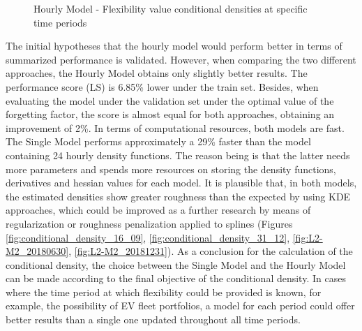 

\begin{figure}[htbp]
\centering    
{}
\caption{Hourly Model - Flexibility value conditional densities at specific time periods}
\label{fig:conditional_densities_L2}
\end{figure}


The initial hypotheses that the hourly model would perform better in terms of summarized performance is validated. However, when comparing the two different approaches, the Hourly Model obtains only slightly better results. The performance score (LS) is 6.85\% lower under the train set. Besides, when evaluating the model under the validation set under the optimal value of the forgetting factor, the score is almost equal for both approaches, obtaining an improvement of 2\%. In terms of computational resources, both models are fast. The Single Model performs approximately a 29\% faster than the model containing 24 hourly density functions. The reason being is that the latter needs more parameters and spends more resources on storing the density functions, derivatives and hessian values for each model.  It is plausible that, in both models, the estimated densities show greater roughness than the expected by using KDE approaches, which could be improved as a further research by means of regularization or roughness penalization applied to splines (Figures \ref{fig:conditional_density_16_09}, \ref{fig:conditional_density_31_12}, \ref{fig:L2-M2_20180630}, \ref{fig:L2-M2_20181231}).
As a conclusion for the calculation of the conditional density, the choice between the Single Model and the Hourly Model can be made according to the final objective of the conditional density. In cases where the time period at which flexibility could be provided is known, for example, the possibility of EV fleet portfolios, a model for each period could offer better results than a single one updated throughout all time periods. 

